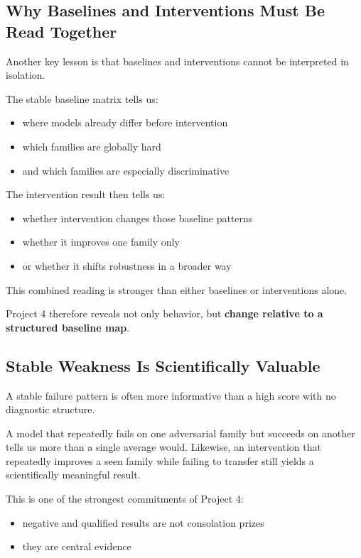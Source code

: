 \documentclass[11pt]{article}
\begin{document}
\subsection{Why Baselines and Interventions Must Be Read Together}

Another key lesson is that baselines and interventions cannot be interpreted in isolation.

The stable baseline matrix tells us:
\begin{itemize}[leftmargin=1.5em]
    \item where models already differ before intervention
    \item which families are globally hard
    \item and which families are especially discriminative
\end{itemize}

The intervention result then tells us:
\begin{itemize}[leftmargin=1.5em]
    \item whether intervention changes those baseline patterns
    \item whether it improves one family only
    \item or whether it shifts robustness in a broader way
\end{itemize}

This combined reading is stronger than either baselines or interventions alone.

Project 4 therefore reveals not only behavior, but \textbf{change relative to a structured baseline map}.

\subsection{Stable Weakness Is Scientifically Valuable}

A stable failure pattern is often more informative than a high score with no diagnostic structure.

A model that repeatedly fails on one adversarial family but succeeds on another tells us more than a single average would. Likewise, an intervention that repeatedly improves a seen family while failing to transfer still yields a scientifically meaningful result.

This is one of the strongest commitments of Project 4:
\begin{itemize}[leftmargin=1.5em]
    \item negative and qualified results are not consolation prizes
    \item they are central evidence
\end{itemize}
\end{document}
